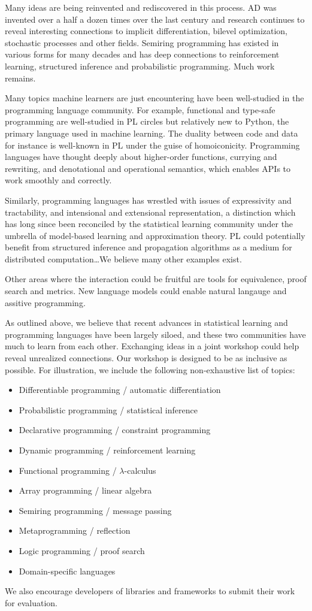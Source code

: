 \documentclass{article}
\begin{document}
    Many ideas are being reinvented and rediscovered in this process. AD was invented over a half a dozen times over the last century and research continues to reveal interesting connections to implicit differentiation, bilevel optimization, stochastic processes and other fields. Semiring programming has existed in various forms for many decades and has deep connections to reinforcement learning, structured inference and probabilistic programming. Much work remains.

    Many topics machine learners are just encountering have been well-studied in the programming language community. For example, functional and type-safe programming are well-studied in PL circles but relatively new to Python, the primary language used in machine learning. The duality between code and data for instance is well-known in PL under the guise of homoiconicity. Programming languages have thought deeply about higher-order functions, currying and rewriting, and denotational and operational semantics, which enables APIs to work smoothly and correctly.

    Similarly, programming languages has wrestled with issues of expressivity and tractability, and intensional and extensional representation, a distinction which has long since been reconciled by the statistical learning community under the umbrella of model-based learning and approximation theory. PL could potentially benefit from structured inference and propagation algorithms as a medium for distributed computation\ldots We believe many other examples exist.

    Other areas where the interaction could be fruitful are tools for equivalence, proof search and metrics. New language models could enable natural langauge and assitive programming.

    As outlined above, we believe that recent advances in statistical learning and programming languages have been largely siloed, and these two communities have much to learn from each other. Exchanging ideas in a joint workshop could help reveal unrealized connections. Our workshop is designed to be as inclusive as possible. For illustration, we include the following non-exhaustive list of topics:

    \begin{itemize}
      \item Differentiable programming / automatic differentiation
      \item Probabilistic programming / statistical inference
      \item Declarative programming / constraint programming
      \item Dynamic programming / reinforcement learning
      \item Functional programming / $\lambda$-calculus
      \item Array programming / linear algebra
      \item Semiring programming / message passing
      \item Metaprogramming / reflection
      \item Logic programming / proof search
      \item Domain-specific languages
    \end{itemize}

    We also encourage developers of libraries and frameworks to submit their work for evaluation.
\end{document}
